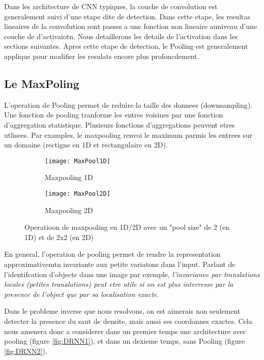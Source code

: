 Dans les architecture de CNN typiques, la couche de convolution est generalement suivi d'une etape dite de detection. Dans cette etape, les resultas lineaires de la convolution sont passes a une fonction non lineaire auniveau d'une couche de d'activaiotn. Nous detaillerons les details de l'activation dans les sections suivantes. Apres cette etape de detection, le Pooling est generalement applique pour modifier les resulats encore plus profoncdement.

\subsection{Le MaxPoling}
\label{subsec:MaxPoling}
L'operation de Pooling permet de reduire la taille des donnees (downsampling). Une fonction de pooling tranforme les entres voisines par une fonction d'aggregation statistique. Plusieurs fonctions d'aggregations peuvent etres utlisees. Par examples, le maxpooling renvoi le maximum parmis les entrees sur un domaine (rectigne en 1D et rectangulaire en 2D). 


\begin{figure}[!h]
\begin{subfigure}{.5\textwidth}
  \centering
  \texttt{[image: MaxPool1D]}  
  \caption[MaxPool1D]{Maxpooling 1D}
\end{subfigure}
\begin{subfigure}{.5\textwidth}
  \centering
  \texttt{[image: MaxPool2D]}  
  \caption[MaxPool2D]{Maxpooling 2D}
\end{subfigure}
\label{fig:MaxPool1D2D}

\centering
\decoRule
\caption[MaxPoling]{Operatioon de maxpooling en 1D/2D avec un "pool size" de 2 (en 1D) et de 2x2 (en 2D)}
\end{figure}


En general, l'operation de pooling permet de rendre la representation approximativemtn invariante aux petite variatons dans l'input. Parlant de l'identifcation d'objects dans une image par exemple, \textit{l'invarianve par translations locales (petites tranalations) peut etre utile si on est plus interresse par la presence de l'object que par sa localisation exacte}\parencite[321ff.]{Reference5}.

Dans le probleme inverse que nous resolvons, on est aimerais non seulement detecter la presence du saut de densite, mais aussi ses coordonnes exactes. Cela nous amenera donc a considerer dans un premier temps une architecture avec pooling (figure \ref{fig:DRNN1}), et dans un dexieme temps, sans Pooling (figure \ref{fig:DRNN2}).
 
